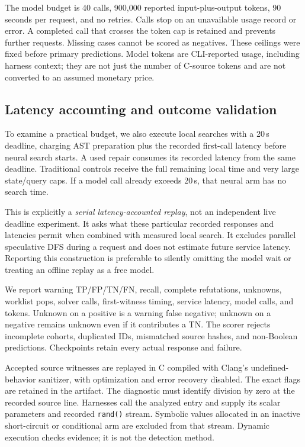 \documentclass[sigconf]{acmart}
\begin{document}
The model budget is 40 calls, 900,000 reported input-plus-output tokens,
90 seconds per request, and no retries. Calls stop on an unavailable usage
record or error. A completed call that crosses the token cap is retained
and prevents further requests. Missing cases cannot be scored as negatives.
These ceilings were fixed before primary predictions. Model tokens are
CLI-reported usage, including harness context; they are not just the number
of C-source tokens and are not converted to an assumed monetary price.

\subsection{Latency accounting and outcome validation}
To examine a practical budget, we also execute local searches with a
20\,s deadline, charging AST preparation plus the recorded first-call
latency before neural search starts. A used repair consumes its recorded
latency from the same deadline. Traditional controls receive the full
remaining local time and very large state/query caps. If a model call
already exceeds 20\,s, that neural arm has no search time.

This is explicitly a \emph{serial latency-accounted replay}, not an
independent live deadline experiment. It asks what these particular
recorded responses and latencies permit when combined with measured local
search. It excludes parallel speculative DFS during a request and does
not estimate future service latency. Reporting this construction is
preferable to silently omitting the model wait or treating an offline
replay as a free model.

We report warning TP/FP/TN/FN, recall, complete refutations, unknowns,
worklist pops, solver calls, first-witness timing, service latency,
model calls, and tokens. Unknown on a positive is a warning false negative;
unknown on a negative remains unknown even if it contributes a TN.
The scorer rejects incomplete cohorts, duplicated IDs, mismatched source
hashes, and non-Boolean predictions. Checkpoints retain every actual
response and failure.

Accepted source witnesses are replayed in C compiled with Clang's
undefined-behavior sanitizer, with optimization and error recovery disabled.
The exact flags are retained in the artifact. The diagnostic
must identify division by zero at the recorded source line. Harnesses call
the analyzed entry and supply its scalar parameters and recorded
\texttt{rand()} stream. Symbolic values allocated in an inactive
short-circuit or conditional arm are excluded from that stream. Dynamic
execution checks evidence; it is not the detection method.
\end{document}
